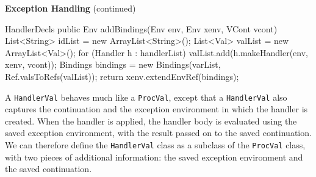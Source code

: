 \begin{minipage}[t]{\sw}
\slidenumber
\LARGE
{\bf Exception Handling} (continued)
\Large
\begin{qv}
HandlerDecls
    public Env addBindings(Env env, Env xenv, VCont vcont) {
        List<String> idList = new ArrayList<String>();
        List<Val> valList = new ArrayList<Val>();
        for (Handler h : handlerList)
            valList.add(h.makeHandler(env, xenv, vcont));
        Bindings bindings =
            new Bindings(varList, Ref.valsToRefs(valList));
        return xenv.extendEnvRef(bindings);
    }
\end{qv}
\LARGE
A \verb'HandlerVal' behaves much like a \verb'ProcVal',
except that a \verb'HandlerVal' also captures
the continuation and the exception environment
in which the handler is created.
When the handler is applied,
the handler body is evaluated
using the saved exception environment,
with the result passed on to the saved continuation.
We can therefore define the \verb'HandlerVal' class
as a subclass of the \verb'ProcVal' class,
with two pieces of additional information:
the saved exception environment and the saved continuation.
\end{minipage}
